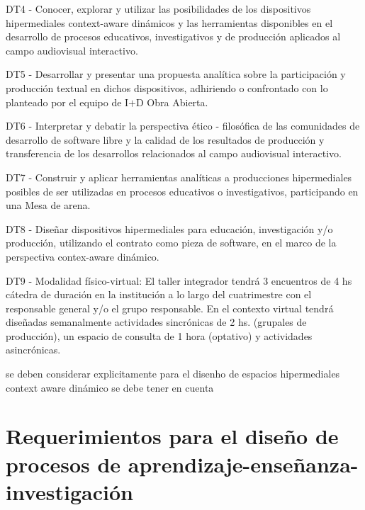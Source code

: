 \documentclass{llncs}
\begin{document}
\begin{description}
\bigskip
\item DT4 - Conocer, explorar y utilizar las posibilidades de los dispositivos hipermediales context-aware dinámicos y las herramientas disponibles en el desarrollo de procesos educativos, investigativos y de producción aplicados al campo audiovisual interactivo.

\bigskip
\item DT5 - Desarrollar y presentar una propuesta analítica sobre la participación  y producción textual en dichos dispositivos, adhiriendo o confrontado con lo planteado por el equipo de I$+$D Obra Abierta.

\bigskip

\item DT6 - Interpretar y debatir la perspectiva ético - filosófica de las comunidades de desarrollo de software libre y la calidad de los resultados de producción y transferencia de los desarrollos relacionados al campo audiovisual interactivo.

\bigskip
\item DT7 - Construir y aplicar herramientas analíticas a producciones hipermediales posibles de ser utilizadas en procesos educativos o investigativos, participando en una  Mesa de arena.

\bigskip

\item DT8 - Diseñar dispositivos hipermediales para educación, investigación y/o producción, utilizando el contrato como pieza de software, en el marco de la perspectiva contex-aware dinámico.

\bigskip
\item DT9 - Modalidad físico-virtual: El taller integrador tendrá 3 encuentros de 4 hs cátedra de duración en la institución a lo largo del cuatrimestre con el responsable general y/o el grupo responsable. En el contexto virtual tendrá diseñadas semanalmente actividades sincrónicas de 2 hs. (grupales de producción), un espacio de consulta de 1 hora (optativo) y actividades asincrónicas.
\end{description}



se deben considerar explicitamente  para el disenho de espacios hipermediales context aware dinámico \cite{libro} se debe tener en cuenta 


\section {Requerimientos para el diseño de procesos de aprendizaje-enseñanza-investigación}
\end{document}
